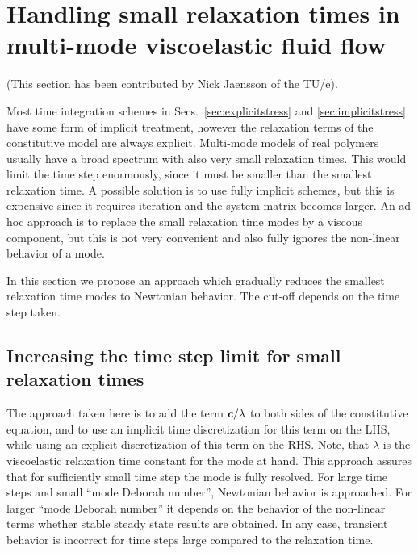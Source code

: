
\def\headdate{4th June 2020}
\label{sec:small_lambda}

\section{Handling small relaxation times in multi-mode viscoelastic fluid flow}

(This section has been contributed by Nick Jaensson of the TU/e).\medskip

Most time integration schemes in Secs.~\ref{sec:explicitstress} and
\ref{sec:implicitstress} have some form of implicit treatment, however the
relaxation terms of the constitutive model are always explicit. Multi-mode
models of real polymers usually have a broad spectrum with also very small
relaxation times. This would limit the time step enormously, since it must be
smaller than the smallest relaxation time. A possible solution is to use fully
implicit schemes, but this is expensive since it requires iteration and the
system matrix becomes larger. An ad hoc approach is to 
replace the small relaxation time modes by a viscous component, but this is not
very convenient and also fully ignores the non-linear behavior of a mode.

In this section we propose an approach which gradually reduces the smallest
relaxation time modes to Newtonian behavior. The cut-off depends on the time
step taken.

\subsection{Increasing the time step limit for small relaxation times}

The approach taken here is to add
the term $\boldsymbol{c}/\lambda$ to both sides of the constitutive 
equation, and to use an implicit time discretization for this term on the LHS, 
while using an explicit discretization of this term on the RHS. Note, that
$\lambda$ is the viscoelastic relaxation time constant for the mode at hand.
This approach assures that for sufficiently small time step the mode is fully
resolved. For large time steps and small ``mode Deborah number'', Newtonian
behavior is approached. For larger ``mode Deborah number'' it depends on the
behavior of the non-linear terms whether stable steady state
results are obtained. In any case,
transient behavior is incorrect for time steps large compared to the
relaxation time.

